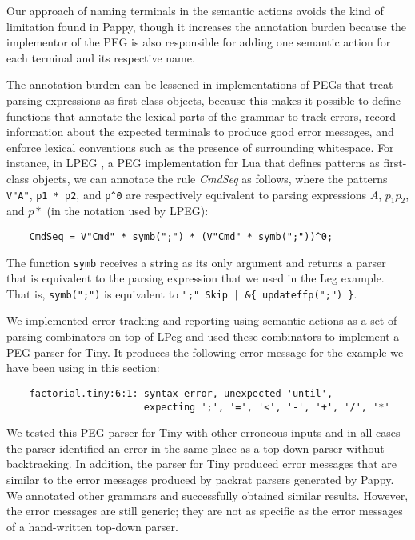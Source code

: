 \documentclass[3p,12pt,singlecolumn]{elsarticle}
\begin{document}
Our approach of naming terminals in the semantic actions avoids the
kind of limitation found in Pappy, though it increases the annotation
burden because the implementor of the PEG is also responsible for
adding one semantic action for each terminal and its respective name.

The annotation burden can be lessened in implementations of PEGs that
treat parsing expressions as first-class objects, because this makes
it possible to define functions that annotate the lexical parts of the grammar to track errors, record information about the expected
 terminals to produce good error messages, and enforce lexical
  conventions such as the presence of surrounding whitespace.
For instance, in LPEG \cite{lpeg,ierusalimschy2009lpeg}, a PEG
implementation for Lua that defines patterns as first-class objects,
we can annotate the rule \textit{CmdSeq} as follows,
where the patterns \verb'V"A"', \verb'p1 * p2', and \verb'p^0'
are respectively equivalent to parsing expressions
$A$, $p_1 p_2$, and $p*$ (in the notation used by LPEG):

\begin{verbatim}
    CmdSeq = V"Cmd" * symb(";") * (V"Cmd" * symb(";"))^0;
\end{verbatim}

The function \texttt{symb} receives a string as its only argument and returns a parser that is equivalent to the parsing expression that we used in the Leg example.
That is, \verb'symb(";")' is equivalent to
\verb'";" Skip | &{ updateffp(";") }'.

We implemented error tracking and reporting using semantic actions
as a set of parsing combinators on top of LPeg and used these
combinators to implement a PEG parser for Tiny.
It produces the following error message for the example we have
been using in this section:

\begin{verbatim}
    factorial.tiny:6:1: syntax error, unexpected 'until',
                        expecting ';', '=', '<', '-', '+', '/', '*'
\end{verbatim}

We tested this PEG parser for Tiny with other erroneous inputs and in all
cases the parser identified an error in the same place as a top-down
parser without backtracking.
In addition, the parser for Tiny produced error messages that are
similar to the error messages produced by packrat parsers generated
by Pappy.
We annotated other grammars and successfully obtained
similar results.
However, the error messages are still generic; they are not
as specific as the error messages of a hand-written top-down
parser.
\end{document}
